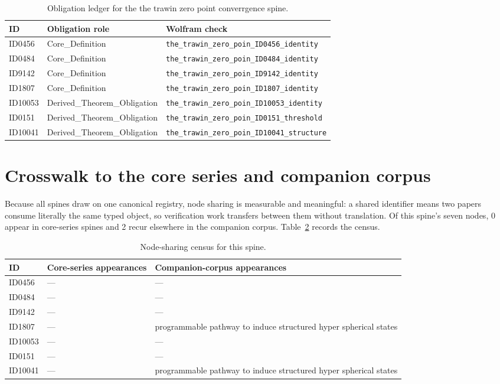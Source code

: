 \documentclass[11pt]{article}
\theoremstyle{remark}
\begin{document}
\begin{table}[ht]
\centering
\small
\caption{Obligation ledger for the the trawin zero point converrgence spine.}
\label{tab:obligations}
\begin{tabular}{llp{6.2cm}}
\toprule
ID & Obligation role & Wolfram check \\
\midrule
ID0456 & Core\_Definition & \texttt{the\_trawin\_zero\_poin\_ID0456\_identity} \\
ID0484 & Core\_Definition & \texttt{the\_trawin\_zero\_poin\_ID0484\_identity} \\
ID9142 & Core\_Definition & \texttt{the\_trawin\_zero\_poin\_ID9142\_identity} \\
ID1807 & Core\_Definition & \texttt{the\_trawin\_zero\_poin\_ID1807\_identity} \\
ID10053 & Derived\_Theorem\_Obligation & \texttt{the\_trawin\_zero\_poin\_ID10053\_identity} \\
ID0151 & Derived\_Theorem\_Obligation & \texttt{the\_trawin\_zero\_poin\_ID0151\_threshold} \\
ID10041 & Derived\_Theorem\_Obligation & \texttt{the\_trawin\_zero\_poin\_ID10041\_structure} \\
\bottomrule
\end{tabular}
\end{table}

\section{Crosswalk to the core series and companion corpus}
\label{sec:crosswalk}

Because all spines draw on one canonical registry, node sharing is measurable and meaningful: a shared identifier means two papers consume literally the same typed object, so verification work transfers between them without translation. Of this spine's seven nodes, 0 appear in core-series spines and 2 recur elsewhere in the companion corpus. Table~\ref{tab:crosswalk} records the census.

\begin{table}[ht]
\centering
\small
\caption{Node-sharing census for this spine.}
\label{tab:crosswalk}
\begin{tabular}{lp{4.4cm}p{6.6cm}}
\toprule
ID & Core-series appearances & Companion-corpus appearances \\
\midrule
ID0456 & --- & --- \\
ID0484 & --- & --- \\
ID9142 & --- & --- \\
ID1807 & --- & programmable pathway to induce structured hyper spherical states \\
ID10053 & --- & --- \\
ID0151 & --- & --- \\
ID10041 & --- & programmable pathway to induce structured hyper spherical states \\
\bottomrule
\end{tabular}
\end{table}
\end{document}

